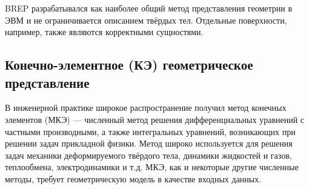 BREP разрабатывался как наиболее общий метод представления геометрии в ЭВМ и не ограничивается описанием твёрдых тел. Отдельные поверхности, например, также являются корректными сущностями.



\subsection{Конечно-элементное (КЭ) геометрическое представление}\label{sec:secGeoFEM}

В инженерной практике широкое распространение получил метод конечных элементов (МКЭ) --- численный метод решения дифференциальных уравнений с частными производными, а также интегральных уравнений, возникающих при решении задач прикладной физики. Метод широко используется для решения задач механики деформируемого твёрдого тела, динамики жидкостей и газов, теплообмена, электродинамики и т.д. МКЭ, как и некоторые другие численные методы, требует геометрическую модель в качестве входных данных.

